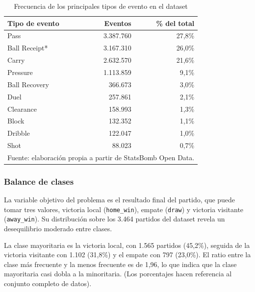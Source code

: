 \begin{table}[H]
    \centering
    \begin{tabular}{lrr}
        \hline
        \textbf{Tipo de evento} & \textbf{Eventos} & \textbf{\% del total} \\
        \hline
        Pass                    & 3.387.760        & 27,8\%                \\
        Ball Receipt*           & 3.167.310        & 26,0\%                \\
        Carry                   & 2.632.570        & 21,6\%                \\
        Pressure                & 1.113.859        & 9,1\%                 \\
        Ball Recovery           & 366.673          & 3,0\%                 \\
        Duel                    & 257.861          & 2,1\%                 \\
        Clearance               & 158.993          & 1,3\%                 \\
        Block                   & 132.352          & 1,1\%                 \\
        Dribble                 & 122.047          & 1,0\%                 \\
        Shot                    & 88.023           & 0,7\%                 \\
        \hline
        \multicolumn{3}{l}{\small Fuente: elaboración propia a partir de StatsBomb Open Data.}
    \end{tabular}
    \caption{Frecuencia de los principales tipos de evento en el dataset}
    \label{tab:event_types}
\end{table}

\subsubsection{Balance de clases}

La variable objetivo del problema es el resultado final del partido, que puede tomar tres valores, victoria local (\texttt{home\_win}), empate (\texttt{draw}) y victoria visitante (\texttt{away\_win}). Su distribución sobre los 3.464 partidos del dataset revela un desequilibrio moderado entre clases.

La clase mayoritaria es la victoria local, con 1.565 partidos (45,2\%), seguida de la victoria visitante con 1.102 (31,8\%) y el empate con 797 (23,0\%). El ratio entre la clase más frecuente y la menos frecuente es de 1,96, lo que indica que la clase mayoritaria casi dobla a la minoritaria. (Los porcentajes hacen referencia al conjunto completo de datos).

